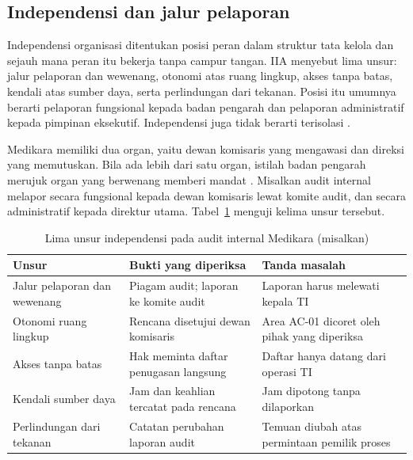 \subsection*{Independensi dan jalur pelaporan}

Independensi organisasi ditentukan posisi peran dalam struktur tata kelola dan sejauh mana peran
itu bekerja tanpa campur tangan. IIA menyebut lima unsur: jalur pelaporan dan wewenang, otonomi
atas ruang lingkup, akses tanpa batas, kendali atas sumber daya, serta perlindungan dari tekanan.
Posisi itu umumnya berarti pelaporan fungsional kepada badan pengarah dan pelaporan administratif
kepada pimpinan eksekutif. Independensi juga tidak berarti terisolasi \cite{iia-tlm2026}.

Medikara memiliki dua organ, yaitu dewan komisaris yang mengawasi dan direksi yang memutuskan.
Bila ada lebih dari satu organ, istilah badan pengarah merujuk organ yang berwenang memberi mandat
\cite{iia-tlm2026}. Misalkan audit internal melapor secara fungsional kepada dewan komisaris lewat
komite audit, dan secara administratif kepada direktur utama. Tabel~\ref{tab:ch12-independensi}
menguji kelima unsur tersebut.

\begin{table}[!htb]
  \centering\small
  \caption{Lima unsur independensi pada audit internal Medikara (misalkan)}
  \label{tab:ch12-independensi}
  \begin{tabularx}{\textwidth}{|>{\raggedright\arraybackslash}p{}|>{\raggedright\arraybackslash}X|>{\raggedright\arraybackslash}X|}
    \hline
    \textbf{Unsur} & \textbf{Bukti yang diperiksa} & \textbf{Tanda masalah} \\ \hline
    Jalur pelaporan dan wewenang & Piagam audit; laporan ke komite audit & Laporan harus melewati
    kepala TI \\ \hline
    Otonomi ruang lingkup & Rencana disetujui dewan komisaris & Area AC-01 dicoret oleh pihak yang
    diperiksa \\ \hline
    Akses tanpa batas & Hak meminta daftar penugasan langsung & Daftar hanya datang dari operasi
    TI \\ \hline
    Kendali sumber daya & Jam dan keahlian tercatat pada rencana & Jam dipotong tanpa dilaporkan
    \\ \hline
    Perlindungan dari tekanan & Catatan perubahan laporan audit & Temuan diubah atas permintaan
    pemilik proses \\ \hline
  \end{tabularx}
\end{table}

